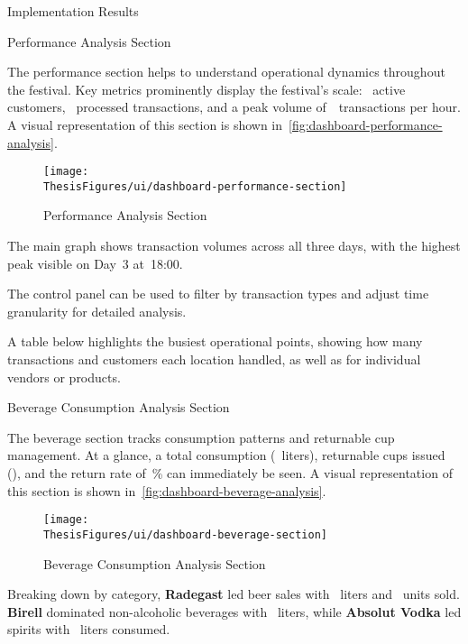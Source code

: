 \begin{section}{Implementation Results}
	\begin{subsection}{Performance Analysis Section}
		\label{subsec:implementation-results-structure-performance}

		The performance section helps to understand operational dynamics throughout the festival.
		Key metrics prominently display the festival's scale: ~active customers, ~processed transactions, and a peak volume of~~transactions per hour.
		A visual representation of this section is shown in~\autoref{fig:dashboard-performance-analysis}.

		\begin{figure}[h]
			\centering
			\texttt{[image: \\ThesisFigures/ui/dashboard-performance-section]}
			\caption{Performance Analysis Section}
			\source
			\label{fig:dashboard-performance-analysis}
		\end{figure}

		The main graph shows transaction volumes across all three days, with the highest peak visible on Day~3 at~18:00.

		The control panel can be used to filter by transaction types and adjust time granularity for detailed analysis.

		A table below highlights the busiest operational points, showing how many transactions and customers each location handled, as well as for individual vendors or products.
	\end{subsection}

	\begin{subsection}{Beverage Consumption Analysis Section}
		\label{subsec:implementation-results-structure-beverage}

		The beverage section tracks consumption patterns and returnable cup management.
		At a glance, a total consumption (~liters), returnable cups issued (), and the return rate of~\% can immediately be seen.
		A visual representation of this section is shown in~\autoref{fig:dashboard-beverage-analysis}.

		\begin{figure}[h]
			\centering
			\texttt{[image: \\ThesisFigures/ui/dashboard-beverage-section]}
			\caption{Beverage Consumption Analysis Section}
			\source
			\label{fig:dashboard-beverage-analysis}
		\end{figure}

		Breaking down by category, \textbf{Radegast} led beer sales with ~liters and ~units sold.
		\textbf{Birell} dominated non-alcoholic beverages with ~liters, while \textbf{Absolut Vodka} led spirits with ~liters consumed.
	\end{subsection}


\end{section}
